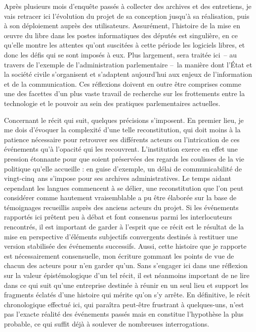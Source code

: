 \documentclass{FramateX}
\begin{document}
\begin{refsection}
Après plusieurs mois d'enquête passés à collecter des archives et des
entretiens, je vais retracer ici l'évolution du projet de sa conception
jusqu'à sa réalisation, puis à son déploiement auprès des utilisateurs.
Assurément, l'histoire de la mise en œuvre du libre dans les postes
informatiques des députés est singulière, en ce qu'elle montre les
attentes qu'ont suscitées à cette période les logiciels libres, et donc
les défis qui se sont imposés à eux. Plus largement, sera traitée ici~–
au travers de l'exemple de l'administration parlementaire –~la manière
dont l'État et la société civile s'organisent et s'adaptent aujourd'hui
aux enjeux de l'information et de la communication. Ces réflexions
doivent en outre être comprises comme une des facettes d'un plus vaste
travail de recherche sur les frottements entre la technologie et le
pouvoir au sein des pratiques parlementaires actuelles.

Concernant le récit qui suit, quelques précisions s'imposent. En premier
lieu, je me dois d'évoquer la complexité d'une telle reconstitution,
qui doit moins à la patience nécessaire pour retrouver ses différents
acteurs ou l'intrication de ces événements qu'à l'opacité qui les
recouvrent. L'institution exerce en effet une pression étonnante pour
que soient préservées des regards les coulisses de la vie politique
qu'elle accueille : en guise d'exemple, un délai de communicabilité de
vingt-cinq~ans s'impose pour ses archives administratives. Le temps
aidant cependant les langues commencent à se délier, une reconstitution
que l'on peut considérer comme hautement vraisemblable a pu être
élaborée sur la base de témoignages recueillis auprès des anciens
acteurs du projet. Si les événements rapportés ici prêtent peu à débat
et font consensus parmi les interlocuteurs rencontrés, il est important
de garder à l'esprit que ce récit est le résultat de la mise en
perspective d'éléments subjectifs convergents destinés à restituer une
version stabilisée des événements successifs. Aussi, cette histoire que
je rapporte est nécessairement consensuelle, mon écriture gommant les
points de vue de chacun des acteurs pour n'en garder qu'un. Sans
s'engager ici dans une réflexion sur la valeur épistémologique d'un tel
récit, il est néanmoins important de ne lire dans ce qui suit qu'une
entreprise destinée à réunir en un seul lieu et support les fragments
éclatés d'une histoire qui mérite qu'on s'y arrête. En définitive, le
récit chronologique effectué ici, qui paraîtra peut-être frustrant à
quelques-uns, n'est pas l'exacte réalité des événements passés mais en
constitue l'hypothèse la plus probable, ce qui suffit déjà à soulever
de nombreuses interrogations.


\end{refsection}
\end{document}
